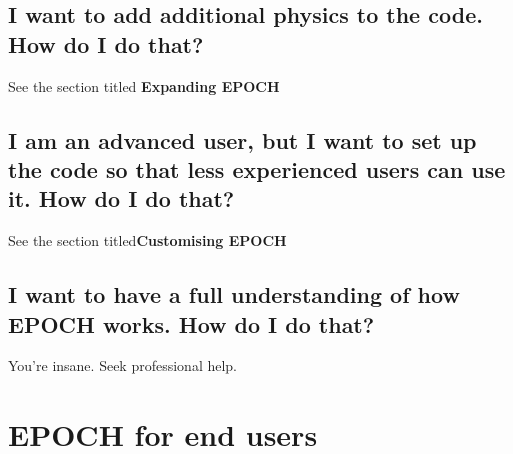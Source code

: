 \documentclass[12pt]{article}
\begin{document}
\subsection{I want to add additional physics to the code. How do I do that?}
See the section titled {\bf Expanding EPOCH}
\subsection{I am an advanced user, but I want to set up the code so that less experienced users can use it. How do I do that?}
See the section titled{\bf Customising EPOCH}
\subsection{I want to have a full understanding of how EPOCH works. How do I do that?}
You're insane. Seek professional help.

\section{EPOCH for end users}
\end{document}
